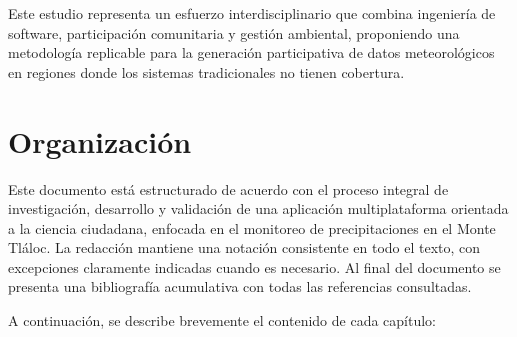 Este estudio representa un esfuerzo interdisciplinario que combina ingeniería de software, participación comunitaria y gestión ambiental, proponiendo una metodología replicable para la generación participativa de datos meteorológicos en regiones donde los sistemas tradicionales no tienen cobertura.




\section{Organización}

Este documento está estructurado de acuerdo con el proceso integral de investigación, desarrollo y validación de una aplicación multiplataforma orientada a la ciencia ciudadana, enfocada en el monitoreo de precipitaciones en el Monte Tláloc. La redacción mantiene una notación consistente en todo el texto, con excepciones claramente indicadas cuando es necesario. Al final del documento se presenta una bibliografía acumulativa con todas las referencias consultadas.

A continuación, se describe brevemente el contenido de cada capítulo:

